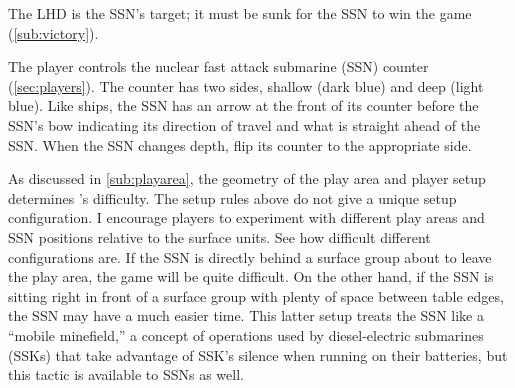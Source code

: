 \documentclass[../TacSubMicroRules.tex]{subfiles}
\begin{document}
 The LHD is the SSN's target; it must be sunk for the SSN to win the game (\ref{sub:victory}).

 The player controls the nuclear fast attack submarine (SSN) counter (\ref{sec:players}).
The counter has two sides, shallow (dark blue) and deep (light blue).
Like ships, the SSN has an arrow at the front of its counter before the SSN's bow indicating its direction of travel and what is straight ahead of the SSN.
When the SSN changes depth, flip its counter to the appropriate side.

\begin{design}
    As discussed in \ref{sub:playarea}, the geometry of the play area and player setup determines \gametitle's difficulty.
    The setup rules above do not give a unique setup configuration.
    I encourage players to experiment with different play areas and SSN positions relative to the surface units.
    See how difficult different configurations are.
    If the SSN is directly behind a surface group about to leave the play area, the game will be quite difficult.
    On the other hand, if the SSN is sitting right in front of a surface group with plenty of space between table edges, the SSN may have a much easier time.
    This latter setup treats the SSN like a ``mobile minefield,'' a concept of operations used by diesel-electric submarines (SSKs) that take advantage of SSK's silence when running on their batteries, but this tactic is available to SSNs as well.
\end{design}
\end{document}
